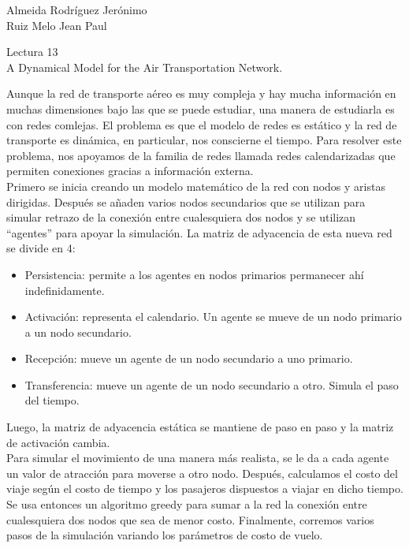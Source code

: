 \documentclass[a4paper, 11pt]{report}
\begin{document}
\begin{flushright}
    Almeida Rodríguez Jerónimo\\
    Ruiz Melo Jean Paul
\end{flushright}

\begin{center}
    {\LARGE Lectura 13}\\
    {\LARGE A Dynamical Model for the Air Transportation Network.}
\end{center}

Aunque la red de transporte aéreo es muy compleja y hay mucha información en
muchas dimensiones bajo las que se puede estudiar, una manera de estudiarla es
con redes comlejas. El problema es que el modelo de redes es estático y la red
de transporte es dinámica, en particular, nos conscierne el tiempo. Para
resolver este problema, nos apoyamos de la familia de redes llamada redes
calendarizadas que permiten conexiones gracias a información externa.\\

Primero se inicia creando un modelo matemático de la red con nodos y aristas
dirigidas. Después se añaden varios nodos secundarios que se utilizan para
simular retrazo de la conexión entre cualesquiera dos nodos y se utilizan
``agentes'' para apoyar la simulación. La matriz de adyacencia de esta nueva red
se divide en 4:
\begin{itemize}
    \item{Persistencia: permite a los agentes en nodos primarios permanecer ahí
        indefinidamente.}
    \item{Activación: representa el calendario. Un agente se mueve de un nodo
        primario a un nodo secundario.}
    \item{Recepción: mueve un agente de un nodo secundario a uno primario.}
    \item{Transferencia: mueve un agente de un nodo secundario a otro. Simula
        el paso del tiempo.}
\end{itemize}
Luego, la matriz de adyacencia estática se mantiene de paso en paso y la matriz
de activación cambia.\\

Para simular el movimiento de una manera más realista, se le da a cada agente un
valor de atracción para moverse a otro nodo. Después, calculamos el costo del
viaje según el costo de tiempo y los pasajeros dispuestos a viajar en dicho
tiempo. Se usa entonces un algoritmo greedy para sumar a la red la conexión
entre cualesquiera dos nodos que sea de menor costo. Finalmente, corremos varios
pasos de la simulación variando los parámetros de costo de vuelo.\\
\end{document}
